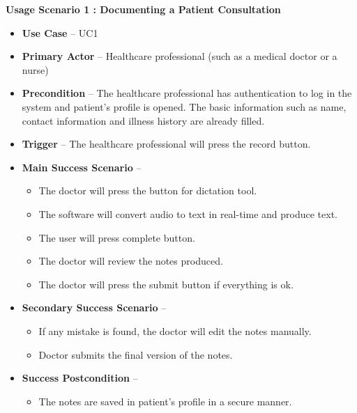 \documentclass[12pt]{article}
\begin{document}
\textbf{Usage Scenario 1 : Documenting a Patient Consultation}

\begin{itemize}
  \item\textbf{Use Case} -- UC1
  \item\textbf{Primary Actor} -- Healthcare professional (such as a medical doctor or a nurse)
  \item\textbf{Precondition} -- The healthcare professional has authentication to log in the system and patient’s profile is opened. The basic information such as name, contact information and illness history are already filled.
  \item\textbf{Trigger} -- The healthcare professional will press the record button.
  \item\textbf{Main Success Scenario} --
  \begin{itemize}
    \item The doctor will press the button for dictation tool.
    \item The software will convert audio to text in real-time and produce text.
    \item The user will press complete button.
    \item  The doctor will review the notes produced.
    \item The doctor will press the submit button if everything is ok.
  \end{itemize}
  \item\textbf{Secondary Success Scenario} --
  \begin{itemize}[label=6.\arabic*]
    \item If any mistake is found, the doctor will edit the notes manually.
    \item Doctor submits the final version of the notes.
  \end{itemize}
  \item\textbf{Success Postcondition} --
  \begin{itemize}
    \item The notes are saved in patient’s profile in a secure manner.
  \end{itemize}
\end{itemize}
\end{document}
